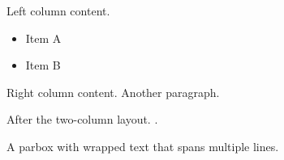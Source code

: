 \documentclass{article}
\begin{document}
\begin{minipage}{0.45\textwidth}
Left column content.
\begin{itemize}
  \item Item A
  \item Item B
\end{itemize}
\end{minipage}
\hfill
\begin{minipage}{0.45\textwidth}
Right column content.
Another paragraph.
\end{minipage}

After the two-column layout.
.
\parbox{5cm}{A parbox with wrapped text that spans multiple lines.}
\end{document}
